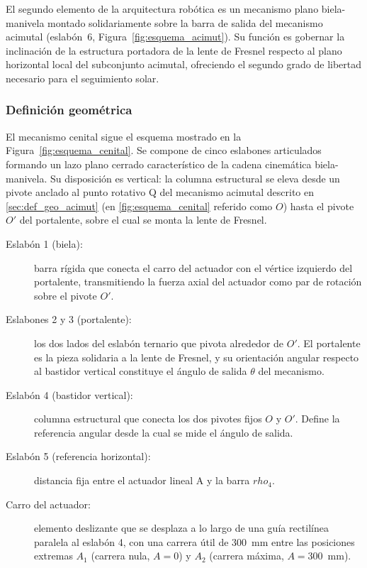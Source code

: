 El segundo elemento de la arquitectura robótica es un mecanismo plano biela-manivela montado solidariamente sobre la barra de salida del mecanismo acimutal (eslabón~6, Figura~\ref{fig:esquema_acimut}). Su función es gobernar la inclinación de la estructura portadora de la lente de Fresnel respecto al plano horizontal local del subconjunto acimutal, ofreciendo el segundo grado de libertad necesario para el seguimiento solar.

\subsubsection{Definición geométrica}
El mecanismo cenital sigue el esquema mostrado en la Figura~\ref{fig:esquema_cenital}. Se compone de cinco eslabones articulados formando un lazo plano cerrado característico de la cadena cinemática biela-manivela. Su disposición es vertical: la columna estructural se eleva desde un pivote anclado al punto rotativo Q del mecanismo acimutal descrito en \ref{sec:def_geo_acimut} (en \ref{fig:esquema_cenital} referido como $O$) hasta el pivote $O'$ del portalente, sobre el cual se monta la lente de Fresnel.

\begin{description}
	\item[Eslabón 1 (biela):] barra rígida que conecta el carro del actuador con el vértice izquierdo del portalente, transmitiendo la fuerza axial del actuador como par de rotación sobre el pivote $O'$.
	
	\item[Eslabones 2 y 3 (portalente):] los dos lados del eslabón ternario que pivota alrededor de $O'$. El portalente es la pieza solidaria a la lente de Fresnel, y su orientación angular respecto al bastidor vertical constituye el ángulo de salida $\theta$ del mecanismo.
	
	\item[Eslabón 4 (bastidor vertical):] columna estructural que conecta los dos pivotes fijos $O$ y $O'$. Define la referencia angular desde la cual se mide el ángulo de salida.
	
	\item[Eslabón 5 (referencia horizontal):] distancia fija entre el actuador lineal A y la barra $rho_4$.
	
	\item[Carro del actuador:] elemento deslizante que se desplaza a lo largo de una guía rectilínea paralela al eslabón 4, con una carrera útil de 300~mm entre las posiciones extremas $A_1$ (carrera nula, $A=0$) y $A_2$ (carrera máxima, $A=300$~mm).
\end{description}

